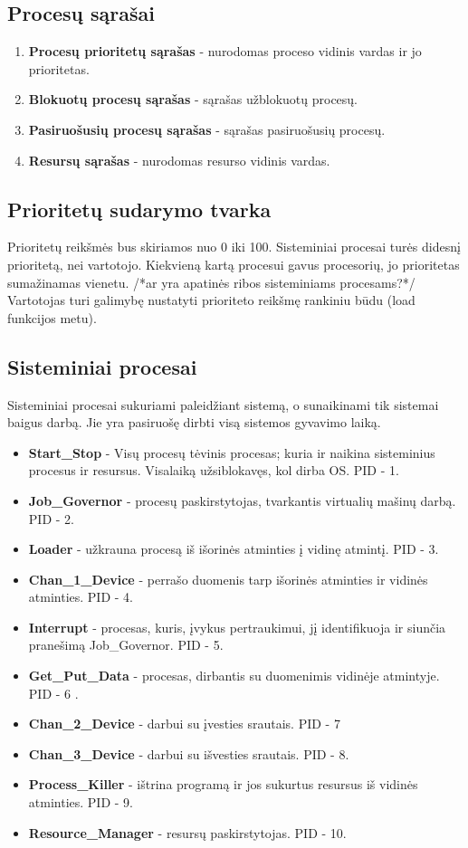 	\subsection{Procesų sąrašai}
		\begin{enumerate}
			\item \textbf{Procesų prioritetų sąrašas} - nurodomas proceso vidinis vardas ir jo prioritetas.
			\item \textbf{Blokuotų procesų sąrašas} - sąrašas užblokuotų procesų.
			\item \textbf{Pasiruošusių procesų sąrašas} - sąrašas pasiruošusių procesų.
			\item  \textbf{Resursų sąrašas} - nurodomas resurso vidinis vardas.
		\end{enumerate}
	\subsection{Prioritetų sudarymo tvarka}
		Prioritetų reikšmės bus skiriamos nuo 0 iki 100. Sisteminiai procesai turės didesnį prioritetą, nei vartotojo. Kiekvieną kartą procesui gavus procesorių, jo prioritetas sumažinamas vienetu. /*ar yra apatinės ribos sisteminiams procesams?*/ Vartotojas turi galimybę nustatyti prioriteto reikšmę rankiniu būdu (load funkcijos metu).
	\subsection{Sisteminiai procesai}
		Sisteminiai procesai sukuriami paleidžiant sistemą, o sunaikinami tik sistemai baigus darbą. Jie yra pasiruošę dirbti visą sistemos gyvavimo laiką. 
		\begin{itemize}
			\item \textbf{Start\_Stop} - Visų procesų tėvinis procesas; kuria ir naikina sisteminius procesus ir resursus. Visalaiką užsiblokavęs, kol dirba OS. PID - 1.
			\item \textbf{Job\_Governor} - procesų paskirstytojas, tvarkantis virtualių mašinų darbą. PID - 2.
			\item \textbf{Loader} - užkrauna procesą iš išorinės atminties į vidinę atmintį. PID - 3.
			\item \textbf{Chan\_1\_Device} - perrašo duomenis tarp išorinės atminties ir vidinės atminties. PID - 4.
			\item \textbf{Interrupt} - procesas, kuris, įvykus pertraukimui, jį identifikuoja ir siunčia pranešimą Job\_Governor. PID - 5.
			\item \textbf{Get\_Put\_Data} - procesas, dirbantis su duomenimis vidinėje atmintyje. PID - 6 .
			\item \textbf{Chan\_2\_Device} - darbui su įvesties srautais. PID - 7
			\item \textbf{Chan\_3\_Device} - darbui su išvesties srautais. PID - 8.
			\item  \textbf{Process\_Killer} - ištrina programą ir jos sukurtus resursus iš vidinės atminties. PID - 9.
			\item \textbf{Resource\_Manager} - resursų paskirstytojas. PID - 10.
		\end{itemize}
